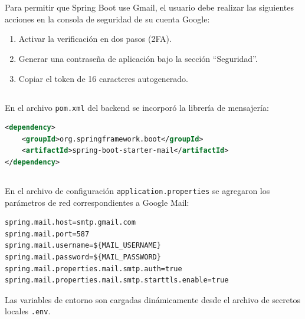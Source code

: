 \documentclass[10pt,a4paper]{article}
\begin{document}
\section{\color{colorIPN}{Desarrollo}}

\subsection{\textit{\color{colorESCOM}{Paso 1: Configuración de la Cuenta de Google}}}
Para permitir que Spring Boot use Gmail, el usuario debe realizar las siguientes acciones en la consola de seguridad de su cuenta Google:
\begin{enumerate}
    \item Activar la verificación en dos pasos (2FA).
    \item Generar una contraseña de aplicación bajo la sección ``Seguridad''.
    \item Copiar el token de 16 caracteres autogenerado.
\end{enumerate}

\subsection{\textit{\color{colorESCOM}{Paso 2: Dependencias del Proyecto}}}
En el archivo \texttt{pom.xml} del backend se incorporó la librería de mensajería:
\begin{lstlisting}[language=XML]
<dependency>
    <groupId>org.springframework.boot</groupId>
    <artifactId>spring-boot-starter-mail</artifactId>
</dependency>
\end{lstlisting}

\subsection{\textit{\color{colorESCOM}{Paso 3: Propiedades del Servidor SMTP}}}
En el archivo de configuración \texttt{application.properties} se agregaron los parámetros de red correspondientes a Google Mail:
\begin{lstlisting}
spring.mail.host=smtp.gmail.com
spring.mail.port=587
spring.mail.username=${MAIL_USERNAME}
spring.mail.password=${MAIL_PASSWORD}
spring.mail.properties.mail.smtp.auth=true
spring.mail.properties.mail.smtp.starttls.enable=true
\end{lstlisting}
Las variables de entorno son cargadas dinámicamente desde el archivo de secretos locales \texttt{.env}.
\end{document}
